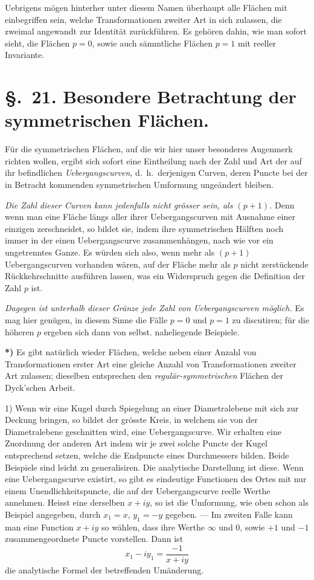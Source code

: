 \documentclass{article}
\begin{document}
Uebrigens mögen hinterher unter diesem Namen überhaupt alle Flächen mit einbegriffen sein, welche Transformationen zweiter Art in sich zulassen, die zweimal angewandt zur Identität zurückführen. Es gehören dahin, wie man sofort sieht, die Flächen $p = 0$, sowie auch sämmtliche Flächen $p = 1$ mit reeller Invariante.

\section*{§.~21. Besondere Betrachtung der symmetrischen Flächen.}

Für die symmetrischen Flächen, auf die wir hier unser besonderes Augenmerk richten wollen, ergibt sich sofort eine Eintheilung nach der Zahl und Art der auf ihr befindlichen \emph{Uebergangscurven}, d.\ h.\ derjenigen Curven, deren Puncte bei der in Betracht kommenden symmetrischen Umformung ungeändert bleiben.

\emph{Die Zahl dieser Curven kann jedenfalls nicht grösser sein, als $(p + 1)$.} Denn wenn man eine Fläche längs aller ihrer Uebergangscurven mit Ausnahme einer einzigen zerschneidet, so bildet sie, indem ihre symmetrischen Hälften noch immer in der einen Uebergangscurve zusammenhängen, nach wie vor ein ungetrenntes Ganze. Es würden sich also, wenn mehr als $(p + 1)$ Uebergangscurven vorhanden wären, auf der Fläche mehr als $p$ nicht zerstückende Rückkehrschnitte ausführen lassen, was ein Widerspruch gegen die Definition der Zahl $p$ ist.

\emph{Dagegen ist unterhalb dieser Gränze jede Zahl von Uebergangscurven möglich.} Es mag hier genügen, in diesem Sinne die Fälle $p = 0$ und $p = 1$ zu discutiren; für die höheren $p$ ergeben sich dann von selbst. naheliegende Beispiele.

\textbf{*)} Es gibt natürlich wieder Flächen, welche neben einer Anzahl von Transformationen erster Art eine gleiche Anzahl von Transformationen zweiter Art zulassen; dieselben entsprechen den \emph{regulär-symmetrischen} Flächen der Dyck'schen Arbeit.


1) Wenn wir eine Kugel durch Spiegelung an einer Diametralebene mit sich zur Deckung bringen, so bildet der grösste Kreis, in welchem sie von der Diametralebene geschnitten wird, eine Uebergangscurve. Wir erhalten eine Zuordnung der anderen Art indem wir je zwei solche Puncte der Kugel entsprechend setzen, welche die Endpuncte eines Durchmessers bilden. Beide Beispiele sind leicht zu generalisiren. Die analytische Darstellung ist diese. Wenn eine Uebergangscurve existirt, so gibt es eindeutige Functionen des Ortes mit nur einem Unendlichkeitspuncte, die auf der Uebergangscurve reelle Werthe annehmen. Heisst eine derselben $x + iy$, so ist die Umformung, wie oben schon als Beispiel angegeben, durch $x_{1} = x$, $y_{1} = - y$ gegeben. --- Im zweiten Falle kann man eine Function $x + iy$ so wählen, dass ihre Werthe $\infty$ und $0$, sowie $+ 1$ und $- 1$ zusammengeordnete Puncte vorstellen. Dann ist
\[ x_{1} - iy_{1} = \frac{- 1}{x + iy} \]
die analytische Formel der betreffenden Umänderung.
\end{document}
